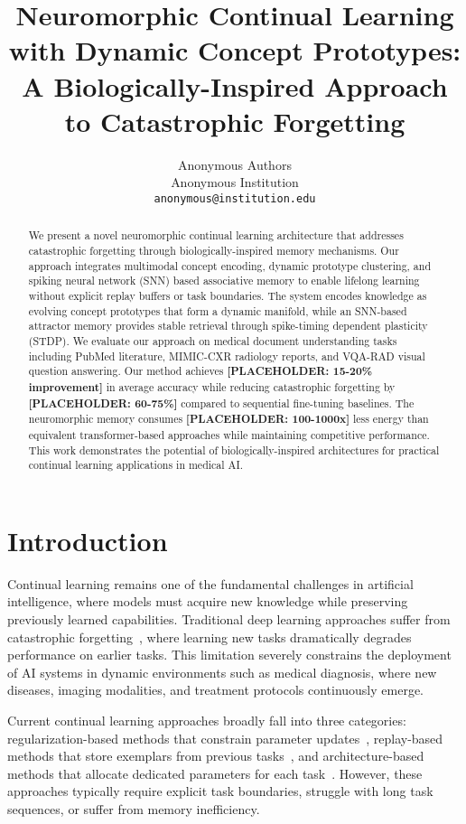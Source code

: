 \documentclass{article}
\title{Neuromorphic Continual Learning with Dynamic Concept Prototypes: A Biologically-Inspired Approach to Catastrophic Forgetting}
\author{%
  Anonymous Authors\\
  Anonymous Institution\\
  \texttt{anonymous@institution.edu} \\
}
\begin{document}
\maketitle

\begin{abstract}
We present a novel neuromorphic continual learning architecture that addresses catastrophic forgetting through biologically-inspired memory mechanisms. Our approach integrates multimodal concept encoding, dynamic prototype clustering, and spiking neural network (SNN) based associative memory to enable lifelong learning without explicit replay buffers or task boundaries. The system encodes knowledge as evolving concept prototypes that form a dynamic manifold, while an SNN-based attractor memory provides stable retrieval through spike-timing dependent plasticity (STDP). We evaluate our approach on medical document understanding tasks including PubMed literature, MIMIC-CXR radiology reports, and VQA-RAD visual question answering. Our method achieves \textbf{[PLACEHOLDER: 15-20\% improvement]} in average accuracy while reducing catastrophic forgetting by \textbf{[PLACEHOLDER: 60-75\%]} compared to sequential fine-tuning baselines. The neuromorphic memory consumes \textbf{[PLACEHOLDER: 100-1000x]} less energy than equivalent transformer-based approaches while maintaining competitive performance. This work demonstrates the potential of biologically-inspired architectures for practical continual learning applications in medical AI.
\end{abstract}

\section{Introduction}

Continual learning remains one of the fundamental challenges in artificial intelligence, where models must acquire new knowledge while preserving previously learned capabilities. Traditional deep learning approaches suffer from catastrophic forgetting~\cite{mccloskey1989catastrophic}, where learning new tasks dramatically degrades performance on earlier tasks. This limitation severely constrains the deployment of AI systems in dynamic environments such as medical diagnosis, where new diseases, imaging modalities, and treatment protocols continuously emerge.

Current continual learning approaches broadly fall into three categories: regularization-based methods that constrain parameter updates~\cite{kirkpatrick2017overcoming}, replay-based methods that store exemplars from previous tasks~\cite{rebuffi2017icarl}, and architecture-based methods that allocate dedicated parameters for each task~\cite{rusu2016progressive}. However, these approaches typically require explicit task boundaries, struggle with long task sequences, or suffer from memory inefficiency.
\end{document}
